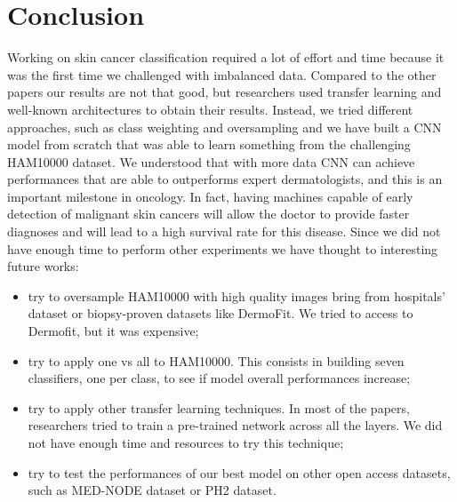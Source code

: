 \section{Conclusion} \label{conclusion}
	
	Working on skin cancer classification required a lot of effort and time because it was the first time we challenged with imbalanced data. 
	Compared to the other papers our results are not that good, but researchers used transfer learning and well-known architectures to obtain their results. Instead, we tried different approaches, such as class weighting and oversampling and we have built a CNN model from scratch that was able to learn something from the challenging HAM10000 dataset. 
	We understood that with more data CNN can achieve performances that are able to outperforms expert dermatologists, and this is an important milestone in oncology. In fact, having machines capable of early detection of malignant skin cancers will allow the doctor to provide faster diagnoses and will lead to a high survival rate for this disease. Since we did not have enough time to perform other experiments we have thought to interesting future works:

	\begin{itemize}
		\item try to oversample HAM10000 with high quality images bring from hospitals' dataset or biopsy-proven datasets like DermoFit\cite{dermofit}. We tried to access to Dermofit, but it was expensive;
		\item try to apply one vs all to HAM10000. This consists in building seven classifiers, one per class, to see if model overall performances increase;
		\item try to apply other transfer learning techniques. In most of the papers, researchers tried to train a pre-trained network across all the layers. We did not have enough time and resources to try this technique;
		\item try to test the performances of our best model on other open access datasets, such as MED-NODE dataset\cite{mednode} or PH2 dataset\cite{ph2}. 	
	\end{itemize}